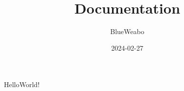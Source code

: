 \documentclass{article}
\title{Documentation}
\date{2024-02-27}
\author{BlueWeabo}
\begin{document}
    \maketitle
    \newpage

    HelloWorld!
\end{document}
